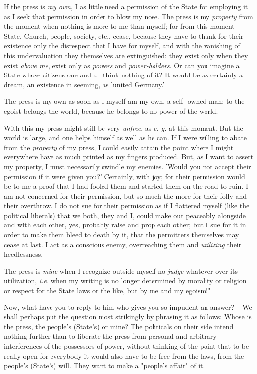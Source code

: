 If the press is \textit{my own}, I as little need a permission of the State 
for employing it as I seek that permission in order to blow my nose. The press 
is my \textit{property} from the moment when nothing is more to me than 
myself; for from this moment State, Church, people, society, etc., cease, 
because they have to thank for their existence only the disrespect that I have 
for myself, and with the vanishing of this undervaluation they themselves are 
extinguished: they exist only when they exist \textit{above me}, exist only as 
\textit{powers} and \textit{power-holders}. Or can you imagine a State whose 
citizens one and all think nothing of it? It would be as certainly a dream, an 
existence in seeming, as 'united Germany.'

The press is my own as soon as I myself am my own, a self- owned man: to the 
egoist belongs the world, because he belongs to no power of the world.

With this my press might still be very \textit{unfree}, as \textit{e. g.} at 
this moment. But the world is large, and one helps himself as well as he can. 
If I were willing to abate from the \textit{property} of my press, I could 
easily attain the point where I might everywhere have as much printed as my 
fingers produced. But, as I want to assert my property, I must necessarily 
swindle my enemies. 'Would you not accept their permission if it were given 
you?' Certainly, with joy; for their permission would be to me a proof that I 
had fooled them and started them on the road to ruin. I am not concerned for 
their permission, but so much the more for their folly and their overthrow. I 
do not sue for their permission as if I flattered myself (like the political 
liberals) that we both, they and I, could make out peaceably alongside and 
with each other, yes, probably raise and prop each other; but I sue for it in 
order to make them bleed to death by it, that the permitters themselves may 
cease at last. I act as a conscious enemy, overreaching them and 
\textit{utilizing} their heedlessness.

The press is \textit{mine} when I recognize outside myself no \textit{judge} 
whatever over its utilization, \textit{i.e.} when my writing is no longer 
determined by morality or religion or respect for the State laws or the like, 
but by me and my egoism!"{}

Now, what have you to reply to him who gives you so impudent an answer? -- We 
shall perhaps put the question most strikingly by phrasing it as follows: 
Whose is the press, the people's (State's) or mine? The politicals on their 
side intend nothing further than to liberate the press from personal and 
arbitrary interferences of the possessors of power, without thinking of the 
point that to be really open for everybody it would also have to be free from 
the laws, from the people's (State's) will. They want to make a "{}people's 
affair"{} of it.

